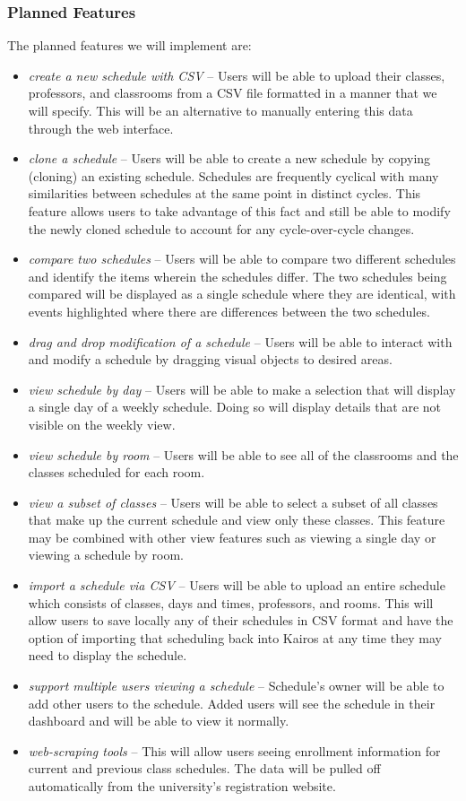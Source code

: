 \documentclass{extarticle}
\begin{document}
\subsubsection{Planned Features}
The planned features we will implement are:
\begin{itemize}
\item \emph{create a new schedule with CSV} -- Users will be able to upload their classes, professors, and
classrooms from a CSV file formatted in a manner that we will specify. This will be an alternative to manually
entering this data through the web interface.
\item \emph{clone a schedule} -- Users will be able to create a new schedule by copying (cloning) an existing
schedule.  Schedules are frequently cyclical with many similarities between schedules at the same point in distinct
cycles.  This feature allows users to take advantage of this fact and still be able to modify the newly cloned
schedule to account for any cycle-over-cycle changes.
\item \emph{compare two schedules} -- Users will be able to compare two different schedules and identify the items
wherein the schedules differ.  The two schedules being compared will be displayed as a single schedule where they
are identical, with events highlighted where there are differences between the two schedules.
\item \emph{drag and drop modification of a schedule} -- Users will be able to interact with and modify a schedule by
dragging visual objects to desired areas.
\item \emph{view schedule by day} -- Users will be able to make a selection that will display a single day of a
weekly schedule.  Doing so will display details that are not visible on the weekly view.
\item \emph{view schedule by room} -- Users will be able to see all of the classrooms and the classes scheduled for
each room.
\item \emph{view a subset of classes} -- Users will be able to select a subset of all classes that make up the
current schedule and view only these classes.  This feature may be combined with other view features such as viewing
a single day or viewing a schedule by room.
\item \emph{import a schedule via CSV} -- Users will be able to upload an entire schedule which consists of classes,
days and times, professors, and rooms. This will allow users to save locally any of their schedules in CSV format
and have the option of importing that scheduling back into Kairos at any time they may need to display the schedule.
\item \emph{support multiple users viewing a schedule} -- Schedule's owner will be able to add other users to the
schedule. Added users will see the schedule in their dashboard and will be able to view it normally.
\item \emph{web-scraping tools} -- This will allow users seeing enrollment information for current and previous
class schedules. The data will be pulled off automatically from the university's registration website.
\end{itemize}
\end{document}
